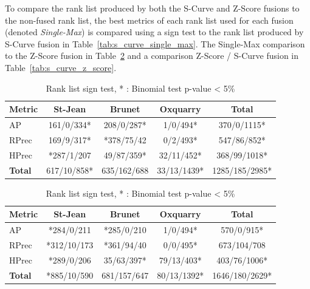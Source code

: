 To compare the rank list produced by both the S-Curve and Z-Score fusions to the non-fused rank list, the best metrics of each rank list used for each fusion (denoted \textit{Single-Max}) is compared using a sign test to the rank list produced by S-Curve fusion in Table~\ref{tab:s_curve_single_max}.
The Single-Max comparison to the Z-Score fusion in Table~\ref{tab:z_score_single_max} and a comparison Z-Score / S-Curve fusion in Table~\ref{tab:s_curve_z_score}.

\begin{table}
  \centering
  \caption{Rank list sign test, * : Binomial test p-value < 5\%}
  \label{tab:fusion_sign_test_comparaisons}

  \label{tab:s_curve_single_max}
  \begin{tabular}{l c c c c}
    \toprule
    Metric         & St-Jean     & Brunet      & Oxquarry    & \textbf{Total} \\ \midrule
    AP             & 161/0/334*  & 208/0/287*  & 1/0/494*    & 370/0/1115*    \\
    RPrec          & 169/9/317*  & *378/75/42  & 0/2/493*    & 547/86/852*    \\
    HPrec          & *287/1/207  & 49/87/359*  & 32/11/452*  & 368/99/1018*   \\
    \textbf{Total} & 617/10/858* & 635/162/688 & 33/13/1439* & 1285/185/2985* \\
    \bottomrule
  \end{tabular}

  \label{tab:z_score_single_max}
  \begin{tabular}{l c c c c}
    \toprule
    Metric        & St-Jean     & Brunet      & Oxquarry    & \textbf{Total} \\ \midrule
    AP            & *284/0/211  & *285/0/210  & 1/0/494*    & 570/0/915*     \\
    RPrec         & *312/10/173 & *361/94/40  & 0/0/495*    & 673/104/708    \\
    HPrec         & *289/0/206  & 35/63/397*  & 79/13/403*  & 403/76/1006*   \\
    \textbf{Total}& *885/10/590 & 681/157/647 & 80/13/1392* & 1646/180/2629* \\
    \bottomrule
  \end{tabular}


\end{table}
